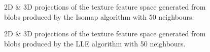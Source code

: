 \begin{figure}[H]
	\centering
	\caption{2D \& 3D projections of the texture feature space generated from blobs produced by the Isomap algorithm with 50 neighbours.}\label{fig:texture_iso_mapping}
\end{figure}

\begin{figure}[H]
	\centering
	\caption{2D \& 3D projections of the texture feature space generated from blobs produced by the LLE algorithm with 50 neighbours.}\label{fig:texture_LLE_mapping}
\end{figure}
\clearpage

